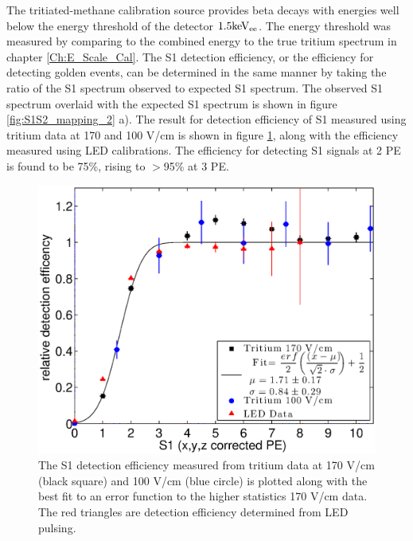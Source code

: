 The tritiated-methane calibration source provides beta decays with energies well below the energy threshold of the detector $\rm 1.5 keV_{ee}$. The energy threshold was measured by comparing to the combined energy to the true tritium spectrum in chapter \ref{Ch:E_Scale_Cal}. The S1 detection efficiency, or the efficiency for detecting golden events, can be determined in the same manner by taking the ratio of the S1 spectrum observed to expected S1 spectrum. The observed S1 spectrum overlaid with the expected S1 spectrum is shown in figure \ref{fig:S1S2_mapping_2} a). The result for detection efficiency of S1 measured using tritium data at 170 and 100 V/cm is shown in figure \ref{fig:S1_Thresh}, along with the efficiency measured using LED calibrations. The efficiency for detecting S1 signals at 2 PE is found to be 75\%, rising to $>$95\% at 3 PE.

\renewcommand{\baselinestretch}{1}
\small\normalsize
\begin{figure}[h!]\centering
\includegraphics[width=120mm]{Chapter_T/Figures/Threshold/S1_thresh_iter1_led.eps}
\caption{The S1 detection efficiency measured from tritium data at 170 V/cm (black square) and 100 V/cm (blue circle) is plotted along with the best fit to an error function to the higher statistics 170 V/cm data. The red triangles are detection efficiency determined from LED pulsing. }
\label{fig:S1_Thresh}
\end{figure}
\renewcommand{\baselinestretch}{2}
\small\normalsize

